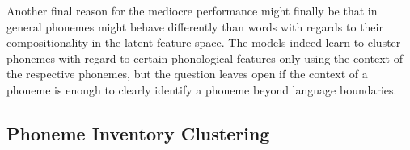 \documentclass[11pt]{article}
\begin{document}
Another final reason for the mediocre performance might finally be that in general phonemes might behave differently than words with regards to their compositionality in the latent feature space. The models indeed learn to cluster phonemes with regard to certain phonological features only using the context of the respective phonemes, but the question leaves open if the context of a phoneme is enough to clearly identify a phoneme beyond language boundaries.
\subsection{Phoneme Inventory Clustering}
\end{document}

